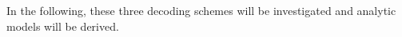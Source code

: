 \documentclass[journal,comsoc]{IEEEtran}
\let\MYoriglatexcaption\caption
\renewcommand{\caption}[2][\relax]{\MYoriglatexcaption[#2]{#2}}
\begin{document}
In the following, these three decoding schemes will be investigated and analytic models will be derived.




%
%
%




\end{document}
